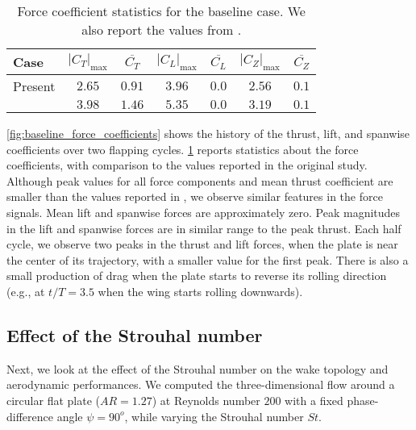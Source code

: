 \begin{table}[!h]
  \centering
  \begin{tabular}{lcccccc}
    \hline\hline
    Case & $\left| C_T \right|_\text{max}$ & $\overline{C_T}$ & $\left| C_L \right|_\text{max}$ & $\overline{C_L}$ & $\left| C_Z \right|_\text{max}$ & $\overline{C_Z}$ \\
    \hline
    Present & $2.65$ & $0.91$ & $3.96$ & $0.0$ & $2.56$ & $0.1$ \\
    \citet{li_dong_2016} & $3.98$ & $1.46$ & $5.35$ & $0.0$ & $3.19$ & $0.1$ \\
    \hline\hline
  \end{tabular}
  \caption{Force coefficient statistics for the baseline case. We also report the values from \citet{li_dong_2016}.}
  \label{tab:baseline_force_coefficients}
\end{table}

\cref{fig:baseline_force_coefficients} shows the history of the thrust, lift, and spanwise coefficients over two flapping cycles.
\cref{tab:baseline_force_coefficients} reports statistics about the force coefficients, with comparison to the values reported in the original study.
Although peak values for all force components and mean thrust coefficient are smaller than the values reported in \citet{li_dong_2016}, we observe similar features in the force signals.
Mean lift and spanwise forces are approximately zero.
Peak magnitudes in the lift and spanwise forces are in similar range to the peak thrust.
Each half cycle, we observe two peaks in the thrust and lift forces, when the plate is near the center of its trajectory, with a smaller value for the first peak.
There is also a small production of drag when the plate starts to reverse its rolling direction (e.g., at $t/T = 3.5$ when the wing starts rolling downwards).

\subsection{Effect of the Strouhal number}

Next, we look at the effect of the Strouhal number on the wake topology and aerodynamic performances.
We computed the three-dimensional flow around a circular flat plate ($AR = 1.27$) at Reynolds number $200$ with a fixed phase-difference angle $\psi = 90^o$, while varying the Strouhal number $St$.

